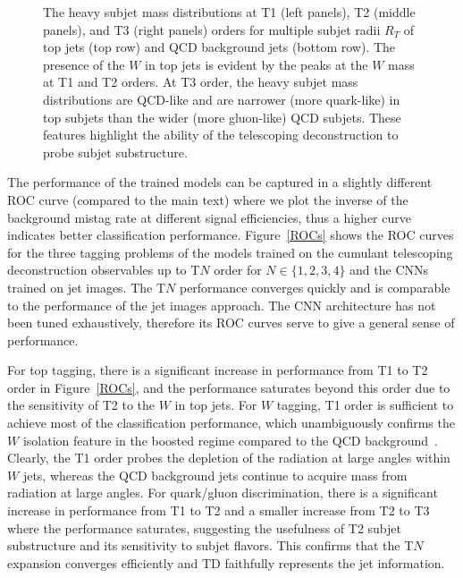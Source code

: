 \documentclass[notoc,preprintnumbers]{JHEP3}
\begin{document}
\begin{figure}[t]
\caption{\label{masses}The heavy subjet mass distributions at T1 (left panels), T2 (middle panels), and T3 (right panels) orders for multiple subjet radii $R_T$ of top jets (top row) and QCD background jets (bottom row). The presence of the $W$ in top jets is evident by the peaks at the $W$ mass at T1 and T2 orders. At T3 order, the heavy subjet mass distributions are QCD-like and are narrower (more quark-like) in top subjets than the wider (more gluon-like) QCD subjets. These features highlight the ability of the telescoping deconstruction to probe subjet substructure.}
\end{figure}

The performance of the trained models can be captured in a slightly different ROC curve (compared to the main text) where we plot the inverse of the background mistag rate at different signal efficiencies, thus a higher curve indicates better classification performance. Figure~\ref{ROCs} shows the ROC curves for the three tagging problems of the models trained on the cumulant telescoping deconstruction observables up to T$N$ order for $N\in\{1,2,3,4\}$ and the CNNs trained on jet images. The T$N$ performance converges quickly and is comparable to the performance of the jet images approach. The CNN architecture has not been tuned exhaustively, therefore its ROC curves serve to give a general sense of performance.

For top tagging, there is a significant increase in performance from T1 to T2 order in Figure~\ref{ROCs}, and the performance saturates beyond this order due to the sensitivity of T2 to the $W$ in top jets. For $W$ tagging, T1 order is sufficient to achieve most of the classification performance, which unambiguously confirms the $W$ isolation feature in the boosted regime compared to the QCD background~\cite{Chien:2017xrb}. Clearly, the T1 order probes the depletion of the radiation at large angles within $W$ jets, whereas the QCD background jets continue to acquire mass from radiation at large angles. For quark/gluon discrimination, there is a significant increase in performance from T1 to T2 and a smaller increase from T2 to T3 where the performance saturates, suggesting the usefulness of T2 subjet substructure and its sensitivity to subjet flavors. This confirms that the T$N$ expansion converges efficiently and TD faithfully represents the jet information.
\end{document}
